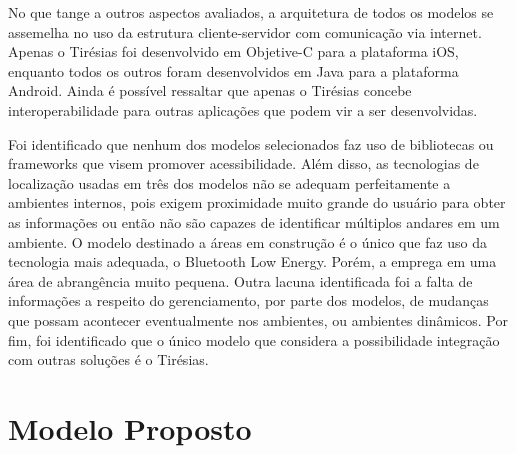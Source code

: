 \documentclass[english,brazilian]{UNISINOSmonografia}
\begin{document}
No que tange a outros aspectos avaliados, a arquitetura de todos os modelos se assemelha no uso da estrutura cliente-servidor com comunicação via internet. Apenas o Tirésias foi desenvolvido em Objetive-C para a plataforma iOS, enquanto todos os outros foram desenvolvidos em Java para a plataforma Android. Ainda é possível ressaltar que apenas o Tirésias concebe interoperabilidade para outras aplicações que podem vir a ser desenvolvidas.

Foi identificado que nenhum dos modelos selecionados faz uso de bibliotecas ou frameworks que visem promover acessibilidade. Além disso, as tecnologias de localização usadas em três dos modelos não se adequam perfeitamente a ambientes internos, pois exigem proximidade muito grande do usuário para obter as informações ou então não são capazes de identificar múltiplos andares em um ambiente. O modelo destinado a áreas em construção é o único que faz uso da tecnologia mais adequada, o Bluetooth Low Energy. Porém, a emprega em uma área de abrangência muito pequena.
Outra lacuna identificada foi a falta de informações a respeito do gerenciamento, por parte dos modelos, de mudanças que possam acontecer eventualmente nos ambientes, ou ambientes dinâmicos. Por fim, foi identificado que o único modelo que considera a possibilidade integração com outras soluções é o Tirésias.

\chapter{Modelo Proposto}
\end{document}
